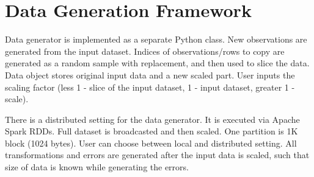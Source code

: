 \section{Data Generation Framework}
\label{sec:data_gen}

Data generator is implemented as a separate Python class. New observations are generated from the input dataset. 
Indices of observations/rows to copy are generated as a random sample with replacement, and then used to slice the data.
Data object stores original input data and a new scaled part. User inputs the scaling factor (less 1 - slice of the input dataset, 1 - input dataset, greater 1 - scale).

There is a distributed setting for the data generator. It is executed via Apache Spark RDDs. 
Full dataset is broadcasted and then scaled. One partition is 1K block (1024 bytes).
User can choose between local and distributed setting. All transformations and errors are generated after the input data is scaled, such that size of data is known while generating the errors.
